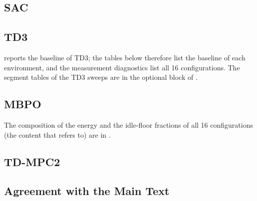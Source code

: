 \subsection{SAC}\label{sec:app-full-sac}


\subsection{TD3}\label{sec:app-full-td3}

 reports the baseline of TD3; the tables below therefore list the baseline of each environment, and the measurement diagnostics list all \num{16} configurations.
The segment tables of the TD3 sweeps are in the optional block of .


\subsection{MBPO}\label{sec:app-full-mbpo}

The composition of the energy and the idle-floor fractions of all \num{16} configurations (the content that  refers to) are in .


\subsection{TD-MPC2}\label{sec:app-full-tdmpc2}


\subsection{Agreement with the Main Text}\label{sec:app-full-verify}

